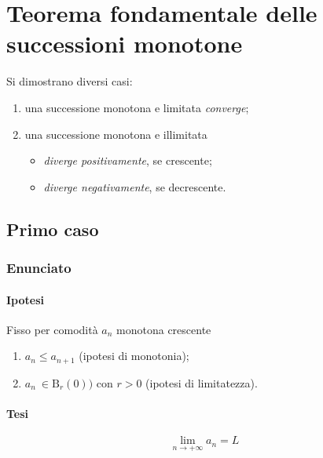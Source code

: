 \documentclass[../../dimostrazioni]{subfiles}
\begin{document}
    \chapter{Teorema fondamentale delle successioni monotone}
    \label{teoFondSuccMono}

        Si dimostrano diversi casi:
        \begin{enumerate}
            \indentitem \item una successione monotona e limitata \emph{converge};
            \indentitem \item una successione monotona e illimitata
                \begin{itemize}
                    \indentitem \item \emph{diverge positivamente}, se crescente;
                    \indentitem \item \emph{diverge negativamente}, se decrescente.
                \end{itemize}
        \end{enumerate}            


        \section*{Primo caso}
            
            \subsection*{Enunciato}
                
                \subsubsection*{Ipotesi}
                         
                Fisso per comodità \(a_n\) monotona crescente

                \begin{enumerate}
                    \indentitem \item \(a_n \leqslant a_{n+1}\) (ipotesi di monotonia);
                    \indentitem \item \(a_n\ \in \mathrm{B}_r(0))\) con \(r > 0 \) (ipotesi di limitatezza).
                \end{enumerate}
                
                \subsubsection*{Tesi}
                    \[\lim_{n \to +\infty} a_n = L\]
            
\end{document}
